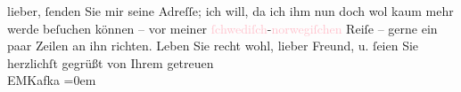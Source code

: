                     lieber, ſenden Sie mir seine Adreſſe; ich will, da ich ihm nun doch wol kaum
                    mehr werde beſuchen können – vor meiner \textcolor{pink}{ſchwediſch}{}\ledrightnote{\textcolor{pink}{Schweden}}-\textcolor{pink}{norwegiſchen}{}\ledrightnote{\textcolor{pink}{Norwegen}} Reiſe –
                    gerne ein paar Zeilen an ihn richten.\pend
           \pstart
           Leben Sie recht wohl, lieber Freund, u. ſeien Sie herzlichſt gegrüßt\pend
           \pstart
           von Ihrem getreuen{\\[\baselineskip]}\spacefill\mbox{EMKafka}\pend
           \leftskip=0em{}\endnumbering{}  
      